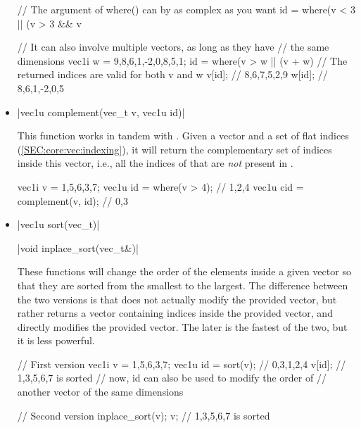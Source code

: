 \documentclass[12pt]{report}
\newenvironment{example}
{
    \begin{mdframed}[style=example,frametitle={Example}]
}
{
    \end{mdframed}
}
\begin{document}
\begin{itemize}
\begin{example}
\begin{cppcode}
// The argument of where() can by as complex as you want
id = where(v < 3 || (v > 3 && v %

// It can also involve multiple vectors, as long as they have
// the same dimensions
vec1i w = {9,8,6,1,-2,0,8,5,1};
id = where(v > w || (v + w) %
// The returned indices are valid for both v and w
v[id]; // {8,6,7,5,2,9}
w[id]; // {8,6,1,-2,0,5}
\end{cppcode}
\end{example}

\item \cppinline|vec1u complement(vec_t v, vec1u id)| 

This function works in tandem with . Given a vector  and a set of flat indices  (\ref{SEC:core:vec:indexing}), it will return the complementary set of indices inside this vector, i.e., all the indices of  that are \emph{not} present in .

\begin{example}
\begin{cppcode}
vec1i v = {1,5,6,3,7};
vec1u id = where(v > 4); // {1,2,4}
vec1u cid = complement(v, id); // {0,3}
\end{cppcode}
\end{example}

\item \cppinline|vec1u sort(vec_t)| 

\cppinline|void inplace_sort(vec_t&)| 

These functions will change the order of the elements inside a given vector so that they are sorted from the smallest to the largest. The difference between the two versions is that  does not actually modify the provided vector, but rather returns a vector containing indices inside the provided vector, and  directly modifies the provided vector. The later is the fastest of the two, but it is less powerful.

\begin{example}
\begin{cppcode}
// First version
vec1i v = {1,5,6,3,7};
vec1u id = sort(v); // {0,3,1,2,4}
v[id]; // {1,3,5,6,7} is sorted
// now, id can also be used to modify the order of
// another vector of the same dimensions

// Second version
inplace_sort(v);
v; // {1,3,5,6,7} is sorted
\end{cppcode}
\end{example}


\end{itemize}
\end{document}
